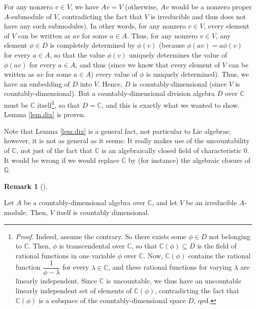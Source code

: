 \documentclass
[numbers=enddot,12pt,final,onecolumn,german,notitlepage]{scrartcl}%
\theoremstyle{definition}
\newtheorem{remk}[theo]{Remark}
\newenvironment{remark}[1][]
{\begin{remk}[#1]\begin{leftbar}}
{\end{leftbar}\end{remk}}
\begin{document}
For any nonzero $v\in V$, we have $Av=V$ (otherwise, $Av$ would be a nonzero
proper $A$-submodule of $V$, contradicting the fact that $V$ is irreducible
and thus does not have any such submodules). In other words, for any nonzero
$v\in V$, every element of $V$ can be written as $av$ for some $a\in A$. Thus,
for any nonzero $v\in V$, any element $\phi\in D$ is completely determined by
$\phi\left(  v\right)  $ (because $\phi\left(  av\right)  =a\phi\left(
v\right)  $ for every $a\in A$, so that the value $\phi\left(  v\right)  $
uniquely determines the value of $\phi\left(  av\right)  $ for every $a\in A$,
and thus (since we know that every element of $V$ can be written as $av$ for
some $a\in A$) every value of $\phi$ is uniquely determined). Thus, we have an
embedding of $D$ into $V$. Hence, $D$ is countably-dimensional (since $V$ is
countably-dimensional). But a countably-dimensional division algebra $D$ over
$\mathbb{C}$ must be $\mathbb{C}$ itself\footnote{\textit{Proof.} Indeed,
assume the contrary. So there exists some $\phi\in D$ not belonging to
$\mathbb{C}$. Then, $\phi$ is transcendental over $\mathbb{C}$, so that
$\mathbb{C}\left(  \phi\right)  \subseteq D$ is the field of rational
functions in one variable $\phi$ over $\mathbb{C}$. Now, $\mathbb{C}\left(
\phi\right)  $ contains the rational function $\dfrac{1}{\phi-\lambda}$ for
every $\lambda\in\mathbb{C}$, and these rational functions for varying
$\lambda$ are linearly independent. Since $\mathbb{C}$ is uncountable, we thus
have an uncountable linearly independent set of elements of $\mathbb{C}\left(
\phi\right)  $, contradicting the fact that $\mathbb{C}\left(  \phi\right)  $
is a subspace of the countably-dimensional space $D$, qed.}, so that
$D=\mathbb{C}$, and this is exactly what we wanted to show. Lemma
\ref{lem.dix} is proven.

Note that Lemma \ref{lem.dix} is a general fact, not particular to Lie
algebras; however, it is not as general as it seems: It really makes use of
the uncountability of $\mathbb{C}$, not just of the fact that $\mathbb{C}$ is
an algebraically closed field of characteristic $0$. It would be wrong if we
would replace $\mathbb{C}$ by (for instance) the algebraic closure of
$\mathbb{Q}$.

\begin{remark}
\label{rem.dix}Let $A$ be a countably-dimensional algebra over $\mathbb{C}$,
and let $V$ be an irreducible $A$-module. Then, $V$ itself is countably dimensional.
\end{remark}
\end{document}

